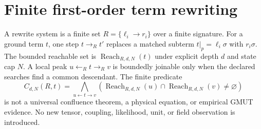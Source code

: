 \documentclass{article}
\begin{document}
\section*{Finite first-order term rewriting}
A rewrite system is a finite set $R=\{\ell_i\to r_i\}$ over a finite signature. For a ground term $t$, one step $t\to_R t'$ replaces a matched subterm $t|_p=\ell_i\sigma$ with $r_i\sigma$. The bounded reachable set is $\operatorname{Reach}_{R,d,N}(t)$ under explicit depth $d$ and state cap $N$. A local peak $u\leftarrow_R t\to_R v$ is boundedly joinable only when the declared searches find a common descendant. The finite predicate
\[
C_{d,N}(R,t)=\bigwedge_{u\leftarrow t\to v}\left(\operatorname{Reach}_{R,d,N}(u)\cap\operatorname{Reach}_{R,d,N}(v)\neq\varnothing\right)
\]
is not a universal confluence theorem, a physical equation, or empirical GMUT evidence. No new tensor, coupling, likelihood, unit, or field observation is introduced.
\end{document}
